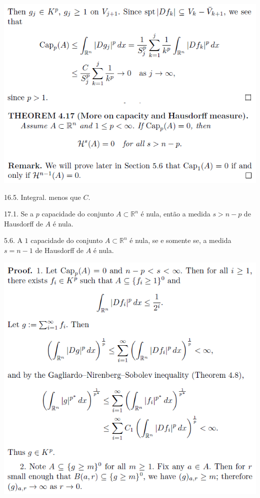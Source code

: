 \documentclass[12pt]{article}
\begin{document}
		\begin{center}
		\includegraphics{20}
		\end{center}

16.5. Integral. menos que $C$.

17.1. Se a $p$ capacidade do conjunto $A \subset \mathbb{R}^n$ \'e nula, ent\~ao a medida $s > n - p$ de Hausdorff de $A$ \'e nula.

5.6. A $1$ capacidade do conjunto $A \subset \mathbb{R}^n$ \'e nula, se e somente se, a medida $s = n - 1$ de Hausdorff de $A$ \'e nula.

\vspace{300mm}

		\begin{center}
		\includegraphics[scale=.9]{21}
		\end{center}
\end{document}
